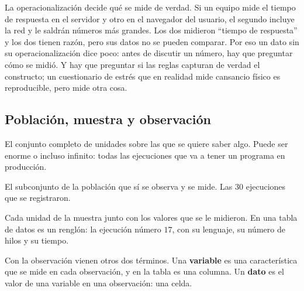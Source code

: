 \documentclass[11pt,letterpaper]{article}
\begin{document}
\begin{ojo}
    La operacionalización decide qué se mide de verdad. Si un equipo
    mide el tiempo de respuesta en el servidor y otro en el navegador
    del usuario, el segundo incluye la red y le saldrán números más
    grandes. Los dos midieron ``tiempo de respuesta'' y los dos tienen
    razón, pero sus datos no se pueden comparar. Por eso un dato sin su
    operacionalización dice poco: antes de discutir un número, hay que
    preguntar cómo se midió. Y hay que preguntar si las reglas capturan
    de verdad el constructo; un cuestionario de estrés que en realidad
    mide cansancio físico es reproducible, pero mide otra cosa.
\end{ojo}


\subsection*{Población, muestra y observación}

\begin{definicion}[Población]
    El conjunto completo de unidades sobre las que se quiere saber
    algo. Puede ser enorme o incluso infinito: todas las ejecuciones
    que va a tener un programa en producción.
\end{definicion}

\begin{definicion}[Muestra]
    El subconjunto de la población que sí se observa y se mide. Las
    $30$ ejecuciones que se registraron.
\end{definicion}

\begin{definicion}[Observación]
    Cada unidad de la muestra junto con los valores que se le midieron.
    En una tabla de datos es un renglón: la ejecución número $17$, con
    su lenguaje, su número de hilos y su tiempo.
\end{definicion}

Con la observación vienen otros dos términos. Una \textbf{variable} es
una característica que se mide en cada observación, y en la tabla es
una columna. Un \textbf{dato} es el valor de una variable en una
observación: una celda.
\end{document}
